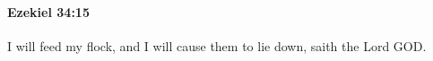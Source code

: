 
		\paragraph{Ezekiel 34:15} %
			\label{EZEKIEL-34-15}

			I will feed my flock, and I will cause them to lie down, saith the Lord GOD.


